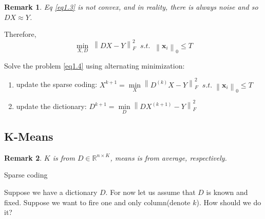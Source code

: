 \documentclass[11pt]{article}
\newtheorem*{remark}{Remark}
\begin{document}
\begin{remark}
	Eq \ref{eq1.3} is not convex, and in reality, there is always noise and so $DX \approx Y$.
\end{remark}

Therefore, 
\begin{equation}
\mathop {\min }\limits_{X,D} \;\left\| {DX - Y} \right\|_F^2\;\;s.t.\;\;{\left\| {{\boldsymbol{x}_i}} \right\|_0} \leqslant T
\label{eq1.4}
\end{equation}

Solve the problem \ref{eq1.4} using alternating minimization:
\begin{enumerate}
	\item update the sparse coding: ${X^{k + 1}} = \mathop {\min }\limits_X \left\| {{D^{\left( k \right)}}X - Y} \right\|_F^2\;\;s.t.\;{\left\| {{\boldsymbol{x}_i}} \right\|_0} \leqslant T$
	\item update the dictionary: ${D^{k + 1}} = \mathop {\min }\limits_D \left\| {D{X^{\left( {k + 1} \right)}} - Y} \right\|_F^2\;\;$
\end{enumerate}

\subsection{K-Means} 

\begin{remark}
	$ K $ is from $ D \in \mathbb{R}^{n\times K} $, means is from average, respectively.
\end{remark}

\begin{center}
	\Large Sparse coding
\end{center}

\vspace{-0.5cm}

Suppose we have a dictionary $ D $. For now let us assume that $ D $ is known and fixed. Suppose we want to fire one and only column(denote $ k $). How should we do it?
\end{document}
